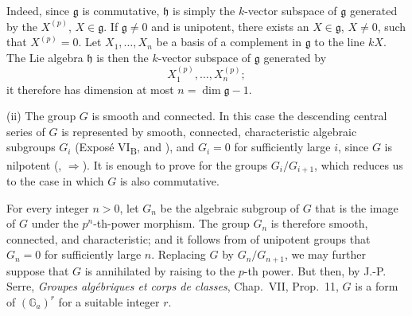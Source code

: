 
Indeed, since \(\mathfrak g\) is commutative, \(\mathfrak h\) is
simply the \(k\)-vector subspace of \(\mathfrak g\) generated by the
\(X^{(p)}\), \(X\in\mathfrak g\).  If \(\mathfrak g\ne0\) and is
unipotent, there exists an \(X\in\mathfrak g\), \(X\ne0\), such
that \(X^{(p)}=0\).  Let \(X_1,\ldots,X_n\) be a basis of a
complement in \(\mathfrak g\) to the line \(kX\).  The Lie algebra
\(\mathfrak h\) is then the \(k\)-vector subspace of
\(\mathfrak g\) generated by
\[
  X_1^{(p)},\ldots,X_n^{(p)};
\]
it therefore has dimension at most
\(n=\dim\mathfrak g-1\).

\smallskip
\noindent(ii) The group \(G\) is smooth and connected.  In this case the
descending central series of \(G\) is represented by smooth,
connected, characteristic algebraic subgroups \(G_i\)
(Exposé VI\textsubscript{B},  and ), and \(G_i=0\) for
sufficiently large \(i\), since \(G\) is nilpotent
(, \(\Rightarrow\)).  It is enough to prove  for the
groups \(G_i/G_{i+1}\), which reduces us to the case in which \(G\)
is also commutative.

For every integer \(n>0\), let \(G_n\) be the algebraic subgroup of
\(G\) that is the image of \(G\) under the \(p^n\)-th-power
morphism.  The group \(G_n\) is therefore smooth, connected, and
characteristic; and it follows from  of unipotent
groups that \(G_n=0\) for sufficiently large \(n\).  Replacing \(G\)
by \(G_n/G_{n+1}\), we may further suppose that \(G\) is annihilated
by raising to the \(p\)-th power.  But then, by J.-P. Serre,
\emph{Groupes algébriques et corps de classes}, Chap.~VII,
Prop.~11, \(G\) is a form of \((\mathbb G_a)^r\) for a suitable
integer \(r\).
